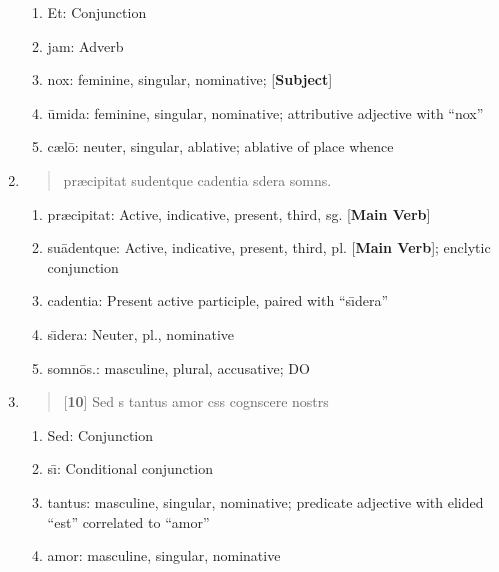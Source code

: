 \documentclass[]{article}
\newcommand{\latify}[1]{
        \Large
        \begin{verse}
          \begin{metrica}
          {#1}\\
          \end{metrica}
        \end{verse}
        \normalsize
}
\begin{document}
\begin{enumerate}
\begin{enumerate}
	\item Et:  Conjunction

	\item jam:  Adverb

	\item nox:  feminine, singular, nominative; [\textbf{Subject}]

	\item \={u}mida:  feminine, singular, nominative; attributive adjective with ``nox''

	\item c{\ae}l\={o}:  neuter, singular, ablative; ablative of place whence
\end{enumerate}


\item \latify{pr{\ae}cipitat su{}dentque cadentia s{\macron {\i}}dera somn{\macron {o}}s.}         

\begin{enumerate}

	\item pr{\ae}cipitat:    Active, indicative, present, third, sg. [\textbf{Main Verb}]

	\item su\={a}dentque:     Active, indicative, present, third, pl. [\textbf{Main Verb}]; enclytic conjunction

	\item cadentia:  Present active participle, paired with ``s\={\i}dera''

	\item s\={\i}dera:  Neuter, pl., nominative

	\item somn\={o}s.: masculine, plural, accusative; DO

\end{enumerate}

\item \latify{[\textbf{10}] Sed s{\macron {\i}} tantus amor c{\macron {a}}s{\macron {u}}s cogn{\macron {o}}scere nostr{\macron {o}}s }
\begin{enumerate}

	\item Sed:  Conjunction

	\item s\={\i}:  Conditional conjunction

	\item tantus: masculine, singular, nominative; predicate adjective with elided ``est'' correlated to ``amor''

	\item amor:  masculine, singular, nominative


\end{enumerate}
\end{enumerate}
\end{document}
